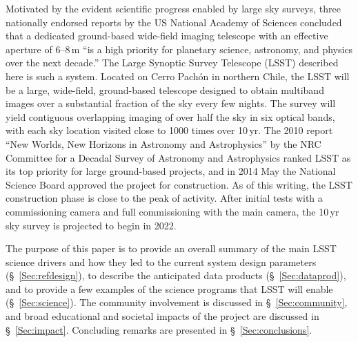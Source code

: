 Motivated by the evident scientific progress enabled by large sky surveys,
three nationally endorsed reports by the US National Academy of Sciences
\citep{NAP9839,NAP10079,NAP10432}
concluded that a dedicated ground-based wide-field imaging telescope with an effective aperture
of 6--8\,m ``is a high priority for planetary science, astronomy, and physics
over the next decade.'' The Large Synoptic Survey Telescope (LSST) described here is
such a system. Located on Cerro Pach\'on in northern Chile,
the LSST will be a large, wide-field, ground-based telescope
designed to obtain multiband images over a substantial fraction of the sky
every few nights. The survey will yield contiguous overlapping imaging of over
half the sky in six optical bands, with each sky location visited close to 1000 times over
10\,yr. The 2010 report ``New Worlds, New Horizons in Astronomy and Astrophysics''
by the NRC Committee for a Decadal Survey of Astronomy and
Astrophysics \citep{NAP12951}
ranked LSST as its top priority for large ground-based projects, and in 2014 May the National
Science Board approved the project for construction.
As of this writing, the LSST construction phase is close to the peak
of activity.
After initial tests with a commissioning camera and full commissioning
with the main camera, the
10\,yr sky survey is projected to begin in 2022.

The purpose of this paper is to provide an overall summary of the main LSST
science drivers and how they led to the current system design parameters
(\S~\ref{Sec:refdesign}), to describe the anticipated data products (\S~\ref{Sec:dataprod}),
and to provide a few examples of the science programs that LSST will enable
(\S~\ref{Sec:science}). The community involvement is discussed in \S~\ref{Sec:community},
and broad educational and societal impacts of the project are discussed in \S~\ref{Sec:impact}. Concluding
remarks are presented in \S~\ref{Sec:conclusions}.

